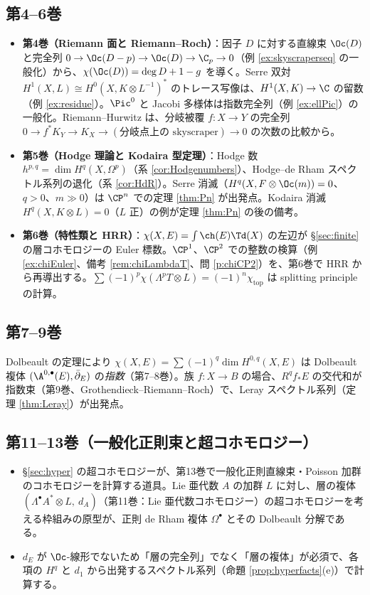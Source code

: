 \subsection{第4--6巻}
\begin{itemize}
\item \textbf{第4巻（Riemann 面と Riemann--Roch）}：因子 $D$ に対する直線束 $\Oc(D)$ と完全列 $0\to\Oc(D-p)\to\Oc(D)\to\C_p\to0$（例 \ref{ex:skyscraperseq} の一般化）から、$\chi(\Oc(D))=\deg D+1-g$ を導く。Serre 双対 $H^1(X,L)\cong H^0(X,K\otimes L^{-1})^*$ のトレース写像は、$H^1(X,K)\to\C$ の留数（例 \ref{ex:residue}）。$\Pic^0$ と Jacobi 多様体は指数完全列（例 \ref{ex:ellPic}）の一般化。Riemann--Hurwitz は、分岐被覆 $f:X\to Y$ の完全列 $0\to f^*K_Y\to K_X\to(\text{分岐点上の skyscraper})\to0$ の次数の比較から。
\item \textbf{第5巻（Hodge 理論と Kodaira 型定理）}：Hodge 数 $h^{p,q}=\dim H^q(X,\Omega^p)$（系 \ref{cor:Hodgenumbers}）、Hodge--de Rham スペクトル系列の退化（系 \ref{cor:HdR}）。Serre 消滅（$H^q(X,F\otimes\Oc(m))=0$、$q>0$、$m\gg0$）は $\CP^n$ での定理 \ref{thm:Pn} が出発点。Kodaira 消滅 $H^q(X,K\otimes L)=0$（$L$ 正）の例が定理 \ref{thm:Pn} の後の備考。
\item \textbf{第6巻（特性類と HRR）}：$\chi(X,E)=\int\ch(E)\Td(X)$ の左辺が §\ref{sec:finite} の層コホモロジーの Euler 標数。$\CP^1$、$\CP^2$ での整数の検算（例 \ref{ex:chiEuler}、備考 \ref{rem:chiLambdaT}、問 \ref{p:chiCP2}）を、第6巻で HRR から再導出する。$\sum(-1)^p\chi(\Lambda^pT\otimes L)=(-1)^n\chi_{\mathrm{top}}$ は splitting principle の計算。
\end{itemize}
\subsection{第7--9巻}
Dolbeault の定理により $\chi(X,E)=\sum(-1)^q\dim H^{0,q}(X,E)$ は Dolbeault 複体 $(\A^{0,\bullet}(E),\bar\partial_E)$ の\emph{指数}（第7--8巻）。族 $f:X\to B$ の場合、$R^qf_*E$ の交代和が指数束（第9巻、Grothendieck--Riemann--Roch）で、Leray スペクトル系列（定理 \ref{thm:Leray}）が出発点。
\subsection{第11--13巻（一般化正則束と超コホモロジー）}
\begin{itemize}
\item \S\ref{sec:hyper} の超コホモロジーが、第13巻で一般化正則直線束・Poisson 加群のコホモロジーを計算する道具。Lie 亜代数 $A$ の加群 $L$ に対し、層の複体 $(\Lambda^\bullet A^*\otimes L,\ d_A)$（第11巻：Lie 亜代数コホモロジー）の超コホモロジーを考える枠組みの原型が、正則 de Rham 複体 $\Omega^\bullet$ とその Dolbeault 分解である。
\item $d_E$ が $\Oc$-線形でないため「層の完全列」でなく「層の複体」が必須で、各項の $H^q$ と $d_1$ から出発するスペクトル系列（命題 \ref{prop:hyperfacts}(e)）で計算する。
\end{itemize}
